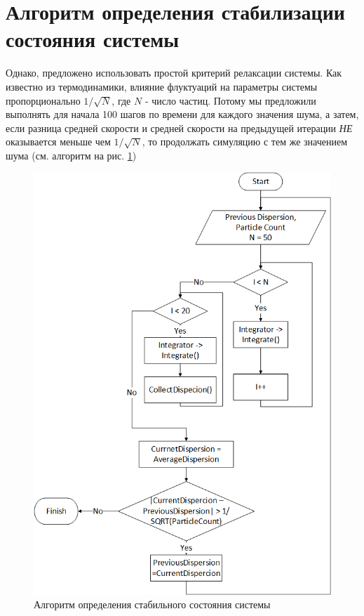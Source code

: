 \section{Алгоритм определения стабилизации состояния системы} %
\label{sec:StabilityAlgorithm}
    Однако, предложено использовать простой критерий релаксации системы. Как известно из термодинамики, влияние флуктуаций на параметры системы пропорционально $1/\sqrt{N}$, где $N$ - число частиц. Потому мы предложили выполнять для начала 100 шагов по времени для каждого значения шума, а затем, если разница средней скорости и средней скорости на предыдущей итерации \textit{НЕ} оказывается меньше чем $1/\sqrt{N}$, то продолжать симуляцию с тем же значением шума (см. алгоритм на рис. \ref{fig:MainAlgorithm})

    \begin{figure}[h]
    \centering
        \includegraphics[width = \textwidth]{Images/MainAlgorithm}
        \caption{Алгоритм определения стабильного состояния системы}
        \label{fig:MainAlgorithm}
    \end{figure}

